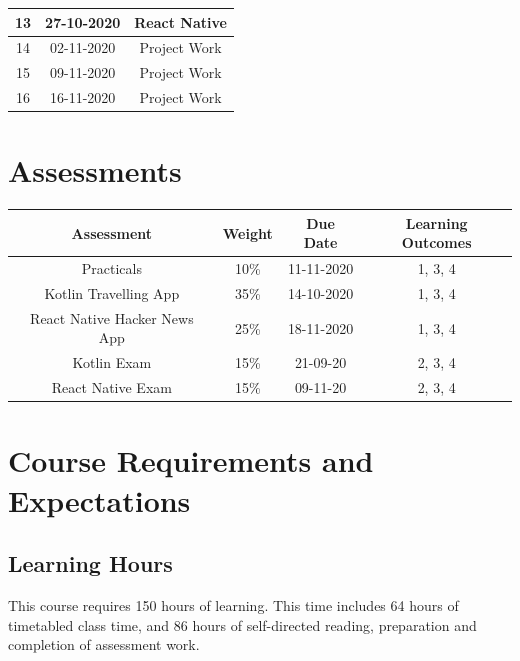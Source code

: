 \documentclass{article}
\begin{document}
\begin{tabular}{|c|c|c|}
	\small 13            & \small 27-10-2020    & \small React Native                                                                \\ \hline             
	\small 14            & \small 02-11-2020    & \small Project Work                                                                             \\ \hline
	\small 15            & \small 09-11-2020    & \small Project Work                                                                             \\ \hline 		  
	\small 16            & \small 16-11-2020    & \small Project Work                                                                               \\ \hline
\end{tabular}
 
\section*{Assessments}
\renewcommand{\arraystretch}{1.5}	
\begin{tabular}{|c|c|c|c|}
	\hline
	\textbf{Assessment}   & \textbf{Weight} & \textbf{Due Date} & \textbf{Learning Outcomes} \\ \hline
	Practicals            & 10\%            & 11-11-2020        & 1, 3, 4                    \\ \hline
	Kotlin Travelling App & 35\%            & 14-10-2020        & 1, 3, 4                    \\ \hline
	React Native Hacker News App       & 25\%            & 18-11-2020        & 1, 3, 4                    \\ \hline
	Kotlin Exam           & 15\%     & 21-09-20                 & 2, 3, 4                    \\ \hline
	React Native Exam           & 15\%     & 09-11-20           & 2, 3, 4                    \\ \hline
\end{tabular} 

\section*{Course Requirements and Expectations}

\subsection*{Learning Hours}
This course requires 150 hours of learning. This time includes 64 hours of timetabled class time, and 86 hours of self-directed reading, preparation and completion of assessment work.
\end{document}
